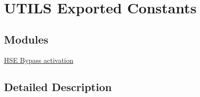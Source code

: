 \hypertarget{group___u_t_i_l_s___l_l___exported___constants}{}\section{U\+T\+I\+LS Exported Constants}
\label{group___u_t_i_l_s___l_l___exported___constants}
\subsection*{Modules}
\begin{DoxyCompactItemize}
\item 
\hyperlink{group___u_t_i_l_s___e_c___h_s_e___b_y_p_a_s_s}{H\+S\+E Bypass activation}
\end{DoxyCompactItemize}


\subsection{Detailed Description}
